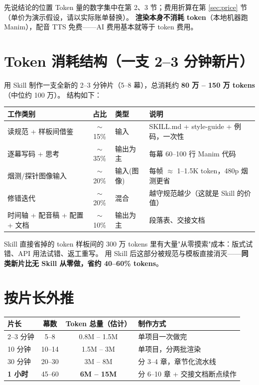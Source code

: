 \documentclass[12pt,a4paper]{ctexart}
\begin{document}
\begin{warnbox}{先说结论的位置}
Token 量的数字集中在第 2、3 节；费用折算在第 \ref{sec:price} 节（单价为演示假设，请以实际账单替换）。
\textbf{渲染本身不消耗 token}（本地机器跑 Manim），配音 TTS 免费——AI 费用基本就等于 token 费用。
\end{warnbox}

\section{Token 消耗结构（一支 2--3 分钟新片）}

用 Skill 制作一支全新的 2--3 分钟片（5--8 幕），总消耗约 \textbf{80 万 -- 150 万 tokens}（中位约 100 万）。
结构如下：

\begin{center}
\begin{tabular}{p{5.6cm} c p{2.2cm} p{4.6cm}}
\hline
\rowcolor{ptbg} 工作类别 & 占比 & 类型 & 说明 \\
\hline
读规范 + 样板间借鉴 & $\sim$15\% & 输入 & SKILL.md + style-guide + 例码，一次性 \\
逐幕写码 + 思考 & $\sim$35\% & 输出为主 & 每幕 60--100 行 Manim 代码 \\
烟测/探针图像输入 & $\sim$20\% & 输入(图像) & 每帧 $\approx$ 1--1.5K token，480p 烟测更省 \\
修错迭代 & $\sim$20\% & 混合 & 越守规范越少（这就是 Skill 的价值） \\
时间轴 + 配音稿 + 配置 + 文档 & $\sim$10\% & 输出为主 & 段落表、交接文档 \\
\hline
\end{tabular}
\end{center}

\begin{okbox}{Skill 直接省掉的 token}
样板间的 300 万 tokens 里有大量"从零摸索"成本：版式试错、API 用法试错、返工重写。
用 Skill 后这部分被规范与模板直接消灭——\textbf{同类新片比无 Skill 从零做，省约 40--60\% tokens}。
\end{okbox}

\section{按片长外推}

\begin{center}
\begin{tabular}{p{4.2cm} c c p{5.2cm}}
\hline
\rowcolor{ptbg} 片长 & 幕数 & Token 总量（估计） & 制作方式 \\
\hline
2--3 分钟 & 5--8 & 0.8M -- 1.5M & 单项目一次做完 \\
10 分钟 & 10--14 & 1.5M -- 3M & 单项目，分两批渲染 \\
30 分钟 & 20--30 & 3M -- 8M & 分 3--4 章，章节化流水线 \\
\textbf{1 小时} & 45--60 & \textbf{6M -- 15M} & 分 6--10 章 + 交接文档断点续作 \\
\hline
\end{tabular}
\end{center}
\end{document}
